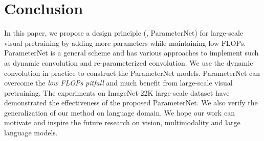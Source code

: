 \documentclass[10pt,twocolumn,letterpaper]{article}
\begin{document}
\section{Conclusion}
In this paper, we propose a design principle (\ie, ParameterNet) for large-scale visual pretraining by adding more parameters while maintaining low FLOPs.
ParameterNet is a general scheme and has various approaches to implement such as dynamic convolution and re-parameterized convolution. We use the dynamic convolution in practice to construct the ParameterNet models. ParameterNet can overcome the \emph{low FLOPs pitfall} and much benefit from large-scale visual pretraining.
The experiments on ImageNet-22K large-scale dataset have demonstrated the effectiveness of the proposed ParameterNet. We also verify the generalization of our method on language domain.
We hope our work can motivate and inspire the future research on vision, multimodality and large language models.


{
    \small
    
    
}

% 
\end{document}
